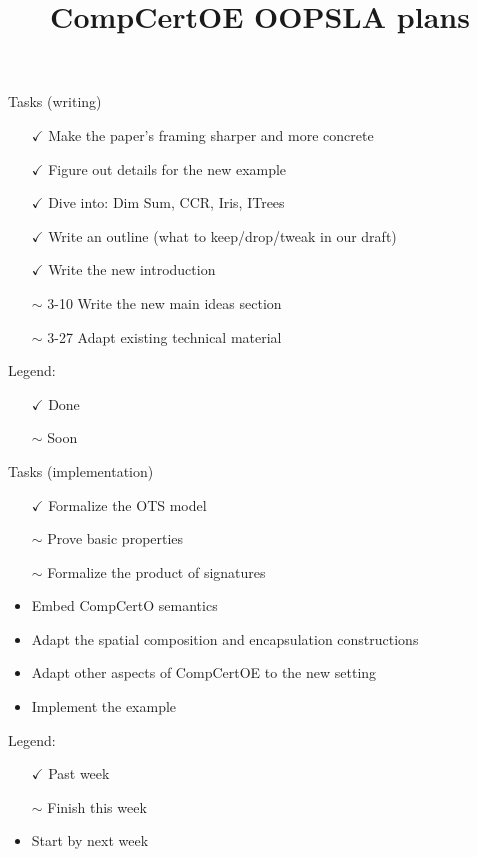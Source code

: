 \documentclass[mathserif,aspectratio=1610]{beamer}
\title{CompCertOE OOPSLA plans}
\begin{document}
\maketitle

\begin{frame}{Tasks (writing)}
\begin{itemize}
\item[$\checkmark$] Make the paper's framing sharper and more concrete
\item[$\checkmark$] Figure out details for the new example
\item[$\checkmark$] Dive into: Dim Sum, CCR, Iris, ITrees 
\item[$\checkmark$] Write an outline (what to keep/drop/tweak in our draft)
\item[$\checkmark$] Write the new introduction
\item[$\sim$ 3-10] Write the new main ideas section
\item[$\sim$ 3-27] Adapt existing technical material
\end{itemize}
\vfill
Legend:
\begin{itemize}
\item[$\checkmark$] Done
\item[$\sim$] Soon
\end{itemize}
\end{frame}

\begin{frame}{Tasks (implementation)}
\begin{itemize}
\item[$\checkmark$] Formalize the OTS model
\item[$\sim$] Prove basic properties
\item[$\sim$] Formalize the product of signatures
\item Embed CompCertO semantics
\item Adapt the spatial composition and encapsulation constructions
\item Adapt other aspects of CompCertOE to the new setting
\item Implement the example
\end{itemize}
\vfill
Legend:
\begin{itemize}
\item[$\checkmark$] Past week
\item[$\sim$] Finish this week
\item Start by next week
\end{itemize}
\end{frame}
\end{document}

